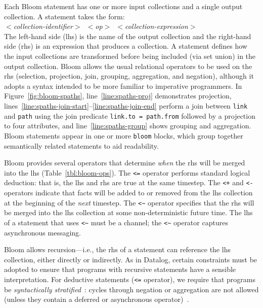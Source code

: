 Each Bloom statement has one or more input collections and a single output
collection.  A statement takes the form: \\ \noindent
\mbox{\hspace{0.25in}\emph{$<$collection-identifier$>$ $<$op$>$
    $<$collection-expression$>$}}\\ \noindent
The left-hand side (lhs) is the name of the output collection and the right-hand
side (rhs) is an expression that produces a collection.  A statement defines how
the input collections are transformed before being included (via set union) in
the output collection. Bloom allows the usual relational operators to be used on
the rhs (selection, projection, join, grouping, aggregation, and negation),
although it adopts a syntax intended to be more familiar to imperative
programmers. In Figure~\ref{fig:bloom-spaths}, line~\ref{line:spaths-proj}
demonstrates projection,
lines~\ref{line:spaths-join-start}--\ref{line:spaths-join-end} perform a join
between \texttt{link} and \texttt{path} using the join predicate
\verb+link.to = path.from+ followed by a projection to four attributes, and
line~\ref{line:spaths-group} shows grouping and aggregation. Bloom statements
appear in one or more \texttt{bloom} blocks, which group together semantically
related statements to aid readability.


Bloom provides several operators that determine \emph{when} the rhs will be
merged into the lhs (Table~\ref{tbl:bloom-ops}). The \verb|<=| operator performs
standard logical deduction: that is, the lhs and rhs are true at the same
timestep. The \verb|<+| and \verb|<-| operators indicate that facts will be
added to or removed from the lhs collection at the beginning of the \emph{next}
timestep. The \verb+<~+ operator specifies that the rhs will be merged into the
lhs collection at some non-deterministic future time. The lhs of a statement
that uses \verb+<~+ must be a channel; the \verb+<~+ operator captures
asynchronous messaging.

Bloom allows recursion---i.e., the rhs of a statement can reference the lhs
collection, either directly or indirectly. As in Datalog, certain constraints
must be adopted to ensure that programs with recursive statements have a
sensible interpretation. For deductive statements (\verb+<=+ operator), we
require that programs be \emph{syntactically stratified}~\cite{Apt1988}: cycles
through negation or aggregation are not allowed (unless they contain a deferred
or asynchronous operator)~\cite{dedalus}.

